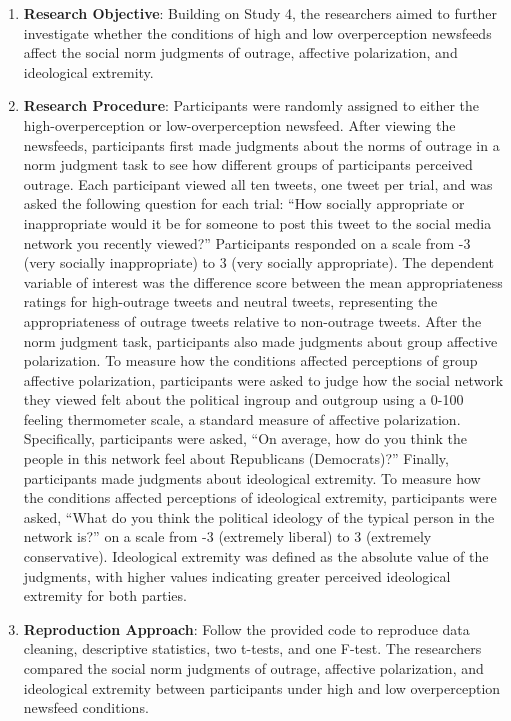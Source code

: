 \documentclass[
  man]{apa6}
\providecommand{\tightlist}{%
  \setlength{\itemsep}{0pt}\setlength{\parskip}{0pt}}
\begin{document}
\begin{enumerate}
\def\labelenumi{\arabic{enumi}.}
\tightlist
\item
  \textbf{Research Objective}:
  Building on Study 4, the researchers aimed to further investigate whether the conditions of high and low overperception newsfeeds affect the social norm judgments of outrage, affective polarization, and ideological extremity.
\item
  \textbf{Research Procedure}:
  Participants were randomly assigned to either the high-overperception or low-overperception newsfeed. After viewing the newsfeeds, participants first made judgments about the norms of outrage in a norm judgment task to see how different groups of participants perceived outrage. Each participant viewed all ten tweets, one tweet per trial, and was asked the following question for each trial: ``How socially appropriate or inappropriate would it be for someone to post this tweet to the social media network you recently viewed?'' Participants responded on a scale from -3 (very socially inappropriate) to 3 (very socially appropriate). The dependent variable of interest was the difference score between the mean appropriateness ratings for high-outrage tweets and neutral tweets, representing the appropriateness of outrage tweets relative to non-outrage tweets. After the norm judgment task, participants also made judgments about group affective polarization. To measure how the conditions affected perceptions of group affective polarization, participants were asked to judge how the social network they viewed felt about the political ingroup and outgroup using a 0-100 feeling thermometer scale, a standard measure of affective polarization. Specifically, participants were asked, ``On average, how do you think the people in this network feel about Republicans (Democrats)?'' Finally, participants made judgments about ideological extremity. To measure how the conditions affected perceptions of ideological extremity, participants were asked, ``What do you think the political ideology of the typical person in the network is?'' on a scale from -3 (extremely liberal) to 3 (extremely conservative). Ideological extremity was defined as the absolute value of the judgments, with higher values indicating greater perceived ideological extremity for both parties.
\item
  \textbf{Reproduction Approach}:
  Follow the provided code to reproduce data cleaning, descriptive statistics, two t-tests, and one F-test. The researchers compared the social norm judgments of outrage, affective polarization, and ideological extremity between participants under high and low overperception newsfeed conditions.
\end{enumerate}
\end{document}
